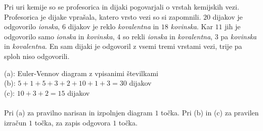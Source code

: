 \documentclass[addpoints]{exam}
\begin{document}
\begin{questions}






    
    \question
    Pri uri kemije so se profesorica in dijaki pogovarjali o vrstah kemijskih vezi.  Profesorica je dijake vprašala, katero vrsto vezi so si zapomnili.
    $20$ dijakov je odgovorilo \textit{ionska}, $6$ dijakov je reklo \textit{kovalentna} in $18$ \textit{kovinska}. Kar $11$ jih je odgovorilo samo \textit{ionska} in \textit{kovinska}, $4$ so rekli \textit{ionska} in \textit{kovalentna},
    $3$ pa \textit{kovinska} in \textit{kovalentna}. En sam dijaki je odgovoril z vsemi tremi vrstami vezi, trije pa sploh niso odgovorili. 

    \begin{solution}[4cm]
        (a): Euler-Vennov diagram z vpisanimi številkami \\
        (b): $5+1+5+3+2+10+1+3=30$ dijakov \\
        (c): $10+3+2=15$ dijakov \\ \\
        Pri (a) za pravilno narisan in izpolnjen diagram $1$ točka. Pri (b) in (c) za pravilen izračun $1$ točka, za zapis odgovora $1$ točka.
    \end{solution}





\end{questions}
\end{document}
